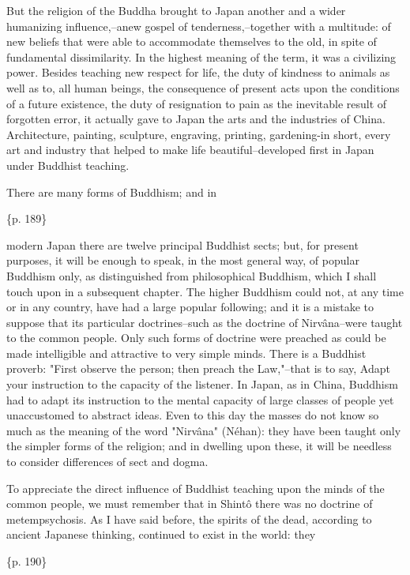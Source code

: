 But the religion of the Buddha brought to Japan another and a wider humanizing influence,--anew gospel of tenderness,--together with a multitude: of new beliefs that were able to accommodate themselves to the old, in spite of fundamental dissimilarity. In the highest meaning of the term, it was a civilizing power. Besides teaching new respect for life, the duty of kindness to animals as well as to, all human beings, the consequence of present acts upon the conditions of a future existence, the duty of resignation to pain as the inevitable result of forgotten error, it actually gave to Japan the arts and the industries of China. Architecture, painting, sculpture, engraving, printing, gardening-in short, every art and industry that helped to make life beautiful--developed first in Japan under Buddhist teaching.



There are many forms of Buddhism; and in

\{p. 189\}

modern Japan there are twelve principal Buddhist sects; but, for present purposes, it will be enough to speak, in the most general way, of popular Buddhism only, as distinguished from philosophical Buddhism, which I shall touch upon in a subsequent chapter. The higher Buddhism could not, at any time or in any country, have had a large popular following; and it is a mistake to suppose that its particular doctrines--such as the doctrine of Nirvâna--were taught to the common people. Only such forms of doctrine were preached as could be made intelligible and attractive to very simple minds. There is a Buddhist proverb: "First observe the person; then preach the Law,"--that is to say, Adapt your instruction to the capacity of the listener. In Japan, as in China, Buddhism had to adapt its instruction to the mental capacity of large classes of people yet unaccustomed to abstract ideas. Even to this day the masses do not know so much as the meaning of the word "Nirvâna" (Néhan): they have been taught only the simpler forms of the religion; and in dwelling upon these, it will be needless to consider differences of sect and dogma.

To appreciate the direct influence of Buddhist teaching upon the minds of the common people, we must remember that in Shintô there was no doctrine of metempsychosis. As I have said before, the spirits of the dead, according to ancient Japanese thinking, continued to exist in the world: they

\{p. 190\}

